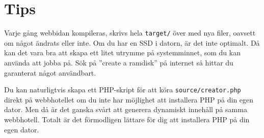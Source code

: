 \documentclass[a4paper,10pt]{article}
\begin{document}
\section{Tips}
Varje gång webbidan kompileras, skrivs hela {\tt target/} över med nya filer, oavsett om något ändrats eller inte. Om du har en SSD i datorn, är det inte optimalt. Då kan det vara bra att skapa ett litet utrymme på systemminnet, som du kan använda att jobba på. Sök på ''create a ramdisk'' på internet så hittar du garanterat något användbart. 

Du kan naturligtvis skapa ett PHP-skript för att köra {\tt source/creator.php} direkt på webbhotellet om du inte har möjlighet att installera PHP på din egen dator. Men då är det ganska svårt att generera dynamiskt innehåll på samma webbhotell. Totalt är det förmodligen lättare för dig att installera PHP på din egen dator. 
\end{document}
